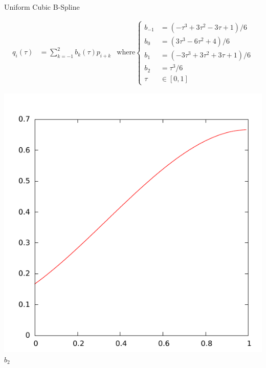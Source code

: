 \documentclass{beamer}
\begin{document}
\begin{frame}{Uniform Cubic B-Spline}
  
  \begin{align*}
    q_i(\tau) &= \sum_{k=-1}^{2}b_{k}(\tau)p_{i+k}
    &
    \text{where}
    \begin{cases}
      b_{-1}     &= (-\tau^3 + 3\tau^2 - 3\tau + 1) / 6 \\
      b_0       &= (3\tau^3 - 6\tau^2 + 4) / 6 \\
      b_1       &= (-3\tau^3 + 3\tau^2 + 3\tau + 1) / 6 \\
      b_2       &= \tau^3 / 6 \\
      \tau      &\in [0,1]
    \end{cases}
  \end{align*}
  
  \begin{minipage}{0.25\columnwidth}
    \centering
    \includegraphics[width=\columnwidth]{b2.pdf}\\
    $b_2$
  \end{minipage}%
  \begin{minipage}{0.25\columnwidth}
    \centering

\end{minipage}
\end{frame}
\end{document}
